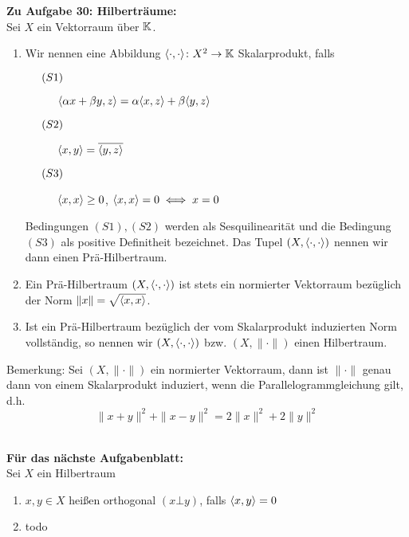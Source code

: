 \textbf{Zu Aufgabe 30: Hilberträume:} \\
Sei $X$ ein Vektorraum über $\mathbb{K}$.
\begin{enumerate}
	\item Wir nennen eine Abbildung $\langle \cdot , \cdot \rangle \colon X^{2} \rightarrow \mathbb{K}$
		Skalarprodukt, falls
 		\begin{description}
 			\item[$\hspace{0.5cm} (S1) \hspace{0.1cm} $] $\langle \alpha x + \beta y , z \rangle = \alpha \langle  x , z \rangle + \beta \langle y , z \rangle$
 			\item[$\hspace{0.5cm} (S2) \hspace{0.1cm} $] $\langle x , y \rangle = \overline{\langle y , z \rangle}$
 			\item[$\hspace{0.5cm} (S3) \hspace{0.1cm} $] $\langle x , x \rangle \geq 0$, $\langle x , x \rangle = 0 \iff x = 0$
 		\end{description}
 		Bedingungen $(S1), (S2)$ werden als Sesquilinearität und die Bedingung $(S3)$ als positive Definitheit bezeichnet. Das Tupel $(X , \langle \cdot , \cdot \rangle)$ nennen wir dann einen Prä-Hilbertraum.
 	\item Ein Prä-Hilbertraum $(X , \langle \cdot , \cdot \rangle)$ ist stets ein normierter Vektorraum bezüglich der Norm $\| x \| = \sqrt{\langle x , x \rangle}$.
 	\item Ist ein Prä-Hilbertraum bezüglich der vom Skalarprodukt induzierten Norm vollständig, so nennen wir $(X , \langle \cdot , \cdot \rangle)$ bzw. $(X , \| \cdot \|)$ einen Hilbertraum.
\end{enumerate}

Bemerkung: Sei $(X, \| \cdot \|)$ ein normierter Vektorraum, dann ist $\| \cdot \|$ genau dann von einem Skalarprodukt induziert, wenn die Parallelogrammgleichung gilt, d.h.
	\[ \| x + y \|^{2} + \| x - y \|^{2} = 2 \| x \|^{2} + 2 \| y \|^{2} \]
~ \newline

\textbf{Für das nächste Aufgabenblatt:} \\
Sei $X$ ein Hilbertraum

\begin{enumerate}
	\item $x, y \in X$ hei{\ss}en orthogonal $(x \bot y)$, falls $\langle x , y \rangle = 0$
	\item todo %
\end{enumerate}


